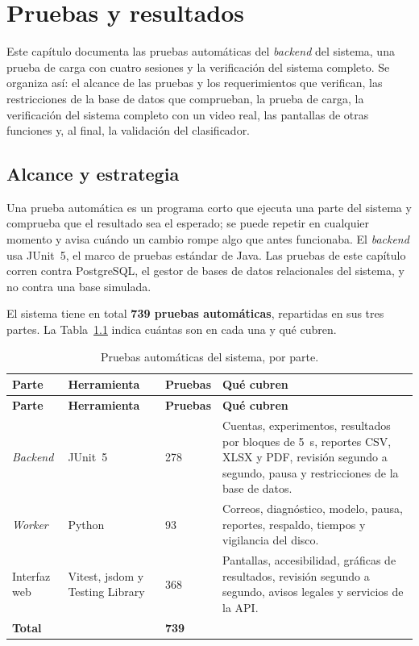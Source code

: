 \chapter{Pruebas y resultados}
\label{cap:pruebas}

Este capítulo documenta las pruebas automáticas del \textit{backend} del sistema, una prueba
de carga con cuatro sesiones y la verificación del sistema completo. Se organiza así: el
alcance de las pruebas y los requerimientos que verifican, las restricciones de la base de
datos que comprueban, la prueba de carga, la verificación del sistema completo con un video
real, las pantallas de otras funciones y, al final, la validación del clasificador.

\section{Alcance y estrategia}
\label{sec:pruebas_estrategia}

Una prueba automática es un programa corto que ejecuta una parte del sistema y comprueba
que el resultado sea el esperado; se puede repetir en cualquier momento y avisa cuándo un
cambio rompe algo que antes funcionaba. El \textit{backend} usa JUnit~5, el marco de pruebas
estándar de Java. Las pruebas de este capítulo corren contra PostgreSQL, el gestor de bases
de datos relacionales del sistema, y no contra una base simulada.

El sistema tiene en total \textbf{739 pruebas automáticas}, repartidas en sus tres partes.
La Tabla~\ref{tab:pruebas_totales} indica cuántas son en cada una y qué cubren.

{\footnotesize\singlespacing
\begin{longtable}{|>{\raggedright}p{2.0cm}|>{\raggedright}p{3.4cm}|>{\raggedright}p{1.4cm}|>{\raggedright\arraybackslash}p{5.8cm}|}
\caption{Pruebas automáticas del sistema, por parte.
\label{tab:pruebas_totales}}\\
\hline
\textbf{Parte} & \textbf{Herramienta} & \textbf{Pruebas} & \textbf{Qué cubren} \\
\hline
\endfirsthead
\hline
\textbf{Parte} & \textbf{Herramienta} & \textbf{Pruebas} & \textbf{Qué cubren} \\
\hline
\endhead
\textit{Backend}
& JUnit~5
& 278
& Cuentas, experimentos, resultados por bloques de 5~s, reportes CSV, XLSX y PDF, revisión segundo a segundo, pausa y restricciones de la base de datos. \\
\hline
\textit{Worker}
& Python
& 93
& Correos, diagnóstico, modelo, pausa, reportes, respaldo, tiempos y vigilancia del disco. \\
\hline
Interfaz web
& Vitest, jsdom y Testing Library
& 368
& Pantallas, accesibilidad, gráficas de resultados, revisión segundo a segundo, avisos legales y servicios de la API. \\
\hline
\textbf{Total}
& & \textbf{739} & \\
\hline
\end{longtable}
}

